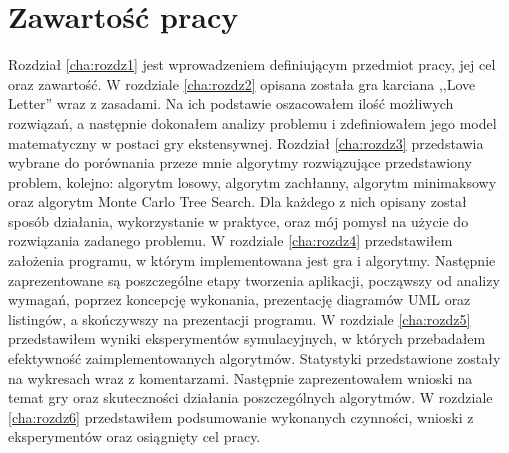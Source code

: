 \section{Zawartość pracy}
\label{sec:zawartoscPracy}
Rozdział \ref{cha:rozdz1} jest wprowadzeniem definiującym przedmiot pracy, jej cel oraz zawartość. W rozdziale \ref{cha:rozdz2} opisana została gra karciana ,,Love Letter'' wraz z zasadami. Na ich podstawie oszacowałem ilość możliwych rozwiązań, a następnie dokonałem analizy problemu i zdefiniowałem jego model matematyczny w postaci gry ekstensywnej. Rozdział \ref{cha:rozdz3} przedstawia wybrane do porównania przeze mnie algorytmy rozwiązujące przedstawiony problem, kolejno: algorytm losowy, algorytm zachłanny, algorytm minimaksowy oraz algorytm Monte Carlo Tree Search. Dla każdego z nich opisany został sposób działania, wykorzystanie w praktyce, oraz mój pomysł na użycie do rozwiązania zadanego problemu. W rozdziale \ref{cha:rozdz4} przedstawiłem założenia programu, w którym implementowana jest gra i algorytmy. Następnie zaprezentowane są poszczególne etapy tworzenia aplikacji, począwszy od analizy wymagań, poprzez koncepcję wykonania, prezentację diagramów UML oraz listingów, a skończywszy na prezentacji programu. W rozdziale \ref{cha:rozdz5} przedstawiłem wyniki eksperymentów symulacyjnych, w których przebadałem efektywność zaimplementowanych algorytmów. Statystyki przedstawione zostały na wykresach wraz z komentarzami. Następnie zaprezentowałem wnioski na temat gry oraz skuteczności działania poszczególnych algorytmów. W rozdziale \ref{cha:rozdz6} przedstawiłem podsumowanie wykonanych czynności, wnioski z eksperymentów oraz osiągnięty cel pracy.